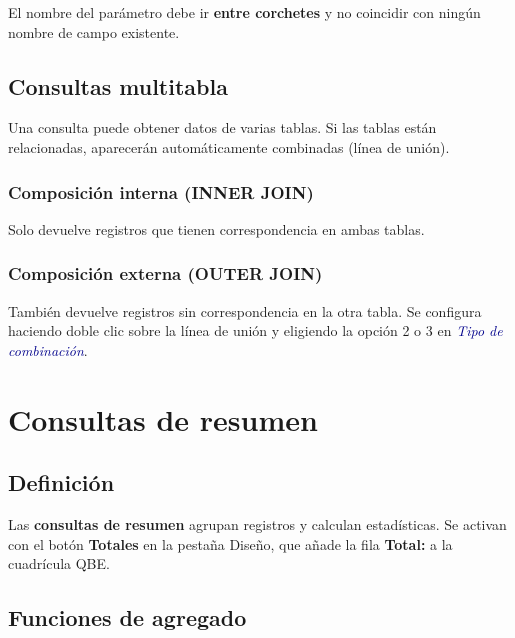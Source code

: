 \documentclass[12pt,a4paper]{article}
\newcommand{\menu}[1]{\textit{\textcolor{darkblue}{#1}}}
\begin{document}
\begin{importante}
El nombre del parámetro debe ir \textbf{entre corchetes} y no coincidir con ningún nombre de campo existente.
\end{importante}

\subsection{Consultas multitabla}

Una consulta puede obtener datos de varias tablas. Si las tablas están relacionadas, aparecerán automáticamente combinadas (línea de unión).

\subsubsection{Composición interna (INNER JOIN)}
Solo devuelve registros que tienen correspondencia en ambas tablas.

\subsubsection{Composición externa (OUTER JOIN)}
También devuelve registros sin correspondencia en la otra tabla. Se configura haciendo doble clic sobre la línea de unión y eligiendo la opción 2 o 3 en \menu{Tipo de combinación}.

\section{Consultas de resumen}

\subsection{Definición}

Las \textbf{consultas de resumen} agrupan registros y calculan estadísticas. Se activan con el botón \textbf{Totales} en la pestaña Diseño, que añade la fila \textbf{Total:} a la cuadrícula QBE.

\subsection{Funciones de agregado}
\end{document}
